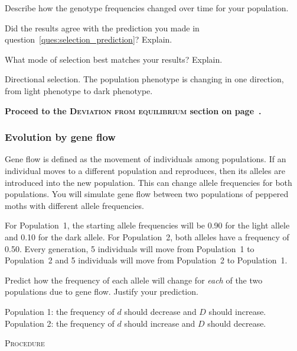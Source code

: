 \documentclass[12pt, hidelinks]{exam}
\newcommand*\AnswerBox[2]{%
    \parbox[t][#1]{0.92\textwidth}{%
    \begin{solution}#2\end{solution}}
    \vspace*{\stretch{0.1}}
}
\newlength{\basespace}
\newcommand{\allele}[1]{$#1$}
\begin{document}
\begin{questions}

\question
Describe how the genotype frequencies changed over time for your population.

\AnswerBox{0.5\basespace}{%
}

\question
Did the results agree with the prediction you made in question~\ref{ques:selection_prediction}? Explain.

\AnswerBox{0.5\basespace}{%
}

\question[Checkout]
What mode of selection best matches your results? Explain.

\AnswerBox{0.5\basespace}{Directional selection. The population phenotype is changing in one direction, from light phenotype to dark phenotype.}

\textbf{Proceed to the \textsc{Deviation from equilibrium} section on page~\pageref{sec:chi_square}.}



\subsubsection*{Evolution by gene flow}\label{sec:gene_flow}

Gene flow is defined as the movement of individuals among populations.  If an individual moves to a different population and reproduces, then its alleles are introduced into the new population.  This can change allele frequencies for both populations. You will simulate gene flow between two populations of peppered moths with different allele frequencies. 

For Population~1, the starting allele frequencies will be 0.90 for the light allele and 0.10 for the dark allele. For Population~2, both alleles have a frequency of 0.50. Every generation, 5 individuals will move from Population~1 to Population~2 and 5 individuals will move from Population~2 to Population~1.

\question\label{ques:migration_prediction}
Predict how the frequency of each allele will change for \emph{each} of the two populations due to gene flow. Justify your prediction.

\AnswerBox{3\baselineskip}{Population 1: the frequency of \allele{d} should decrease and \allele{D} should increase. Population 2: the frequency of \allele{d} should increase and \allele{D} should decrease.}

\textsc{Procedure}

\medskip


\end{questions}
\end{document}
